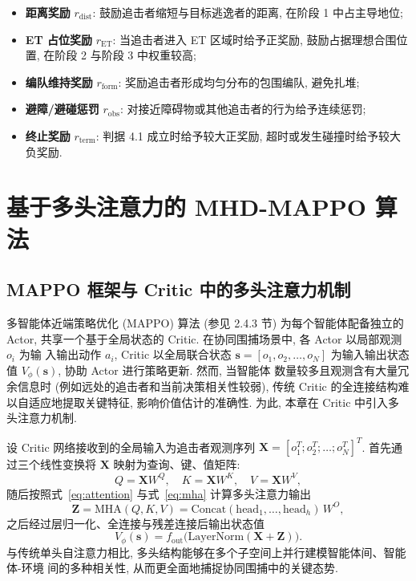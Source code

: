 \begin{itemize}
  \item \textbf{距离奖励} $r_{\mathrm{dist}}$: 鼓励追击者缩短与目标逃逸者的距离, 在阶段 1 中占主导地位;
  \item \textbf{ET 占位奖励} $r_{\mathrm{ET}}$: 当追击者进入 ET 区域时给予正奖励, 鼓励占据理想合围位置, 在阶段 2 与阶段 3 中权重较高;
  \item \textbf{编队维持奖励} $r_{\mathrm{form}}$: 奖励追击者形成均匀分布的包围编队, 避免扎堆;
  \item \textbf{避障/避碰惩罚} $r_{\mathrm{obs}}$: 对接近障碍物或其他追击者的行为给予连续惩罚;
  \item \textbf{终止奖励} $r_{\mathrm{term}}$: 判据 4.1 成立时给予较大正奖励, 超时或发生碰撞时给予较大负奖励.
\end{itemize}

\section{基于多头注意力的 MHD-MAPPO 算法}
\label{sec:mhd_mappo}

\subsection{MAPPO 框架与 Critic 中的多头注意力机制}
\label{subsec:mha_critic}
多智能体近端策略优化 (MAPPO) 算法 (参见 2.4.3 节) 为每个智能体配备独立的 Actor,
共享一个基于全局状态的 Critic. 在协同围捕场景中, 各 Actor 以局部观测 $o_i$ 为输
入输出动作 $a_i$, Critic 以全局联合状态 $\mathbf{s} = [o_1, o_2, \ldots, o_N]$
为输入输出状态值 $V_\phi(\mathbf{s})$, 协助 Actor 进行策略更新. 然而, 当智能体
数量较多且观测含有大量冗余信息时 (例如远处的追击者和当前决策相关性较弱), 传统
Critic 的全连接结构难以自适应地提取关键特征, 影响价值估计的准确性. 为此, 本章在
Critic 中引入多头注意力机制.

设 Critic 网络接收到的全局输入为追击者观测序列 $\mathbf{X} = [o_1^T; o_2^T; \ldots; o_N^T]^T$.
首先通过三个线性变换将 $\mathbf{X}$ 映射为查询、键、值矩阵:
\begin{equation}
Q = \mathbf{X} W^Q,\quad K = \mathbf{X} W^K,\quad V = \mathbf{X} W^V,
\label{eq:qkv}
\end{equation}
随后按照式~\eqref{eq:attention} 与式~\eqref{eq:mha} 计算多头注意力输出
\begin{equation}
\mathbf{Z} = \mathrm{MHA}(Q, K, V) = \mathrm{Concat}(\mathrm{head}_1, \ldots, \mathrm{head}_h)\, W^O,
\end{equation}
之后经过层归一化、全连接与残差连接后输出状态值
\begin{equation}
V_\phi(\mathbf{s}) = f_{\mathrm{out}}\big(\mathrm{LayerNorm}(\mathbf{X} + \mathbf{Z})\big).
\label{eq:vc}
\end{equation}
与传统单头自注意力相比, 多头结构能够在多个子空间上并行建模智能体间、智能体-环境
间的多种相关性, 从而更全面地捕捉协同围捕中的关键态势.

